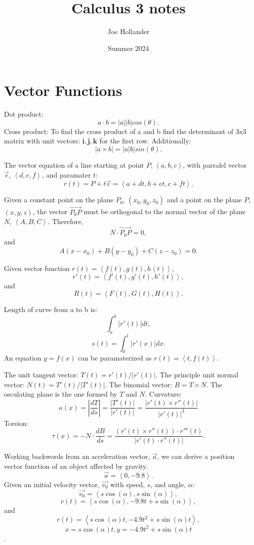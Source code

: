 \documentclass{article}
\title{Calculus 3 notes}
\author{Joe Hollander}
\date{Summer 2024}
\begin{document}
\maketitle


\section*{Vector Functions}
\noindent Dot product: 
\[a \cdot b = |a||b|cos(\theta).\]
Cross product:
To find the cross product of a and b find the
determinant of 3x3 matrix with unit vectors: $\mathbf{i, j, k}$
for the first row. Additionally: 
\[|a \times  b| = |a|b|sin(\theta).\]

The vector equation of a line starting at point $P$, $(a, b, c)$, 
with parralel vector $\vec{v}$, $\left\langle d, e, f\right\rangle$,
and paramater $t$:
\[
r(t) = P + t\vec{v} = 
\left\langle a + dt, b + et, c + ft\right\rangle.
\]

Given a constant point on the plane $P_0$, $(x_0,y_0,z_0)$
and a point on the plane $P$, $(x,y,z)$, 
the vector $\vec{P_0P}$ must be orthogonal to the normal vector of the plane $N$, 
$\left\langle A,B,C \right\rangle$.
Therefore, \[N \cdot \vec{P_0P} = 0, \]
and \[A(x-x_0) + B(y-y_0) + C(z-z_0) = 0.\]

Given vector function $r(t) = \left\langle f(t), g(t), h(t) \right\rangle$,
\[r'(t) = \left\langle f'(t), g'(t), h'(t) \right\rangle,\] and 
\[R(t) = \left\langle F(t), G(t), H(t) \right\rangle.\]


Length of curve from a to b is: \[\int_{a}^{b} |r'(t)| dt,\]
\[s(t) = \int_{0}^{t} |r'(x)| dx.\] An equation $y = f(x)$ can be paramaterized as
$r(t) = \left\langle t, f(t) \right\rangle$. 

The unit tangent vector: $T(t) = r'(t)/|r'(t)|$.
The principle unit normal vector: $N(t) = T'(t)/|T'(t)|$.
The binomial vector: $B = T \times N$. The osculating plane is
the one formed by $T$ and $N$. 
Curvature:
\[
\kappa(x) = |\frac{dT}{ds}| = \frac{|T'(t)|}{|r'(t)|}
= \frac{|r'(t) \times r''(t)|}{|r'(t)|^3}
\]
Torsion:
\[
\tau(x) = -N \cdot \frac{dB}{ds} 
= \frac{(r'(t) \times r''(t)) \cdot r'''(t)}{|r'(t) \cdot r''(t)|}.
\]

Working backwords from an acceleration vector, $\vec{a}$,
we can derive a position vector function of an object affected 
by gravity.
\[\vec{a} = \left\langle0, -9.8\right\rangle.\]
Given an initial velocity vector, $\vec{v_0}$ with speed, $s$,
and angle, $\alpha$: 
\[\vec{v_0} = \left\langle s\cos(\alpha), s\sin(\alpha)\right\rangle,\]
\[v(t) = \left\langle s\cos(\alpha), -9.8t + s\sin(\alpha)\right\rangle,\]
and
\[r(t) = \left\langle s\cos(\alpha)t, -4.9t^2 + s\sin(\alpha)t\right\rangle,\]
\[x = s\cos(\alpha)t, y = -4.9t^2 + s\sin(\alpha)t\].
\end{document}
